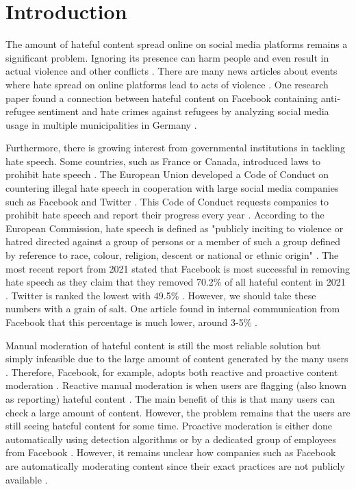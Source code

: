 \chapter{Introduction}

The amount of hateful content spread online on social media platforms remains a significant problem. Ignoring its presence can harm people and even result in actual violence and other conflicts \cite{ecri-hate-speech-and-violence, balayn2021automatic}. There are many news articles about events where hate spread on online platforms lead to acts of violence \cite{columbia-facebook-linked-to-violence, mujib-mashal-india, paul-mozur-2018, muller2021fanning}. One research paper found a connection between hateful content on Facebook containing anti-refugee sentiment and hate crimes against refugees by analyzing social media usage in multiple municipalities in Germany  \cite{muller2021fanning}.

Furthermore, there is growing interest from governmental institutions in tackling hate speech. Some countries, such as France or Canada, introduced laws to prohibit hate speech \cite{davidson2017automated}. The European Union developed a Code of Conduct on countering illegal hate speech in cooperation with large social media companies such as Facebook and Twitter \cite{eu-code-of-conduct}. This Code of Conduct requests companies to prohibit hate speech and report their progress every year \cite{eu-code-of-conduct}. According to the European Commission, hate speech is defined as "publicly inciting to violence or hatred directed against a group of persons or a member of such a group defined by reference to race, colour, religion, descent or national or ethnic origin" \cite{eu-code-of-conduct}. The most recent report from 2021 stated that Facebook is most successful in removing hate speech as they claim that they removed 70.2\% of all hateful content in 2021 \cite{eu-code-of-conduct}. Twitter is ranked the lowest with 49.5\% \cite{eu-code-of-conduct}. However, we should take these numbers with a grain of salt. One article found in internal communication from Facebook that this percentage is much lower, around 3-5\% \cite{noah2021giansiracusa}.

Manual moderation of hateful content is still the most reliable solution but simply infeasible due to the large amount of content generated by the many users \cite{balayn2021automatic}. Therefore, Facebook, for example, adopts both reactive and proactive content moderation \cite{klonick2017new}. Reactive manual moderation is when users are flagging (also known as reporting) hateful content \cite{klonick2017new}. The main benefit of this is that many users can check a large amount of content. However, the problem remains that the users are still seeing hateful content for some time. Proactive moderation is either done automatically using detection algorithms or by a dedicated group of employees from Facebook \cite{klonick2017new}. However, it remains unclear how companies such as Facebook are automatically moderating content since their exact practices are not publicly available \cite{klonick2017new}. 

